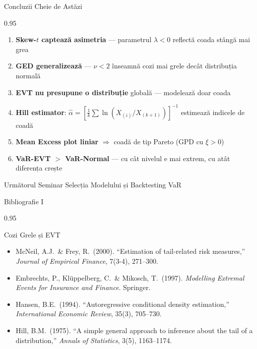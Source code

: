 \documentclass[9pt, aspectratio=169, t]{beamer}
\begin{document}
\begin{frame}{Concluzii Cheie de Astăzi}
    \begin{cminipage}{0.95\textwidth}
    \begin{enumerate}\setlength{\itemsep}{0pt}
        \item \textbf{Skew-$t$ captează asimetria} --- parametrul $\lambda < 0$ reflectă coada stângă mai grea
        \item \textbf{GED generalizează} --- $\nu < 2$ înseamnă cozi mai grele decât distribuția normală
        \item \textbf{EVT nu presupune o distribuție} globală --- modelează doar coada
        \item \textbf{Hill estimator}: $\hat{\alpha} = [\frac{1}{k}\sum \ln(X_{(i)}/X_{(k+1)})]^{-1}$ estimează indicele de coadă
        \item \textbf{Mean Excess plot liniar} $\Rightarrow$ coadă de tip Pareto (GPD cu $\xi > 0$)
        \item \textbf{VaR-EVT $>$ VaR-Normal} --- cu cât nivelul e mai extrem, cu atât diferența crește
    \end{enumerate}

    \vspace{0.3cm}
    \begin{block}{Următorul Seminar}
        Selecția Modelului și Backtesting VaR
    \end{block}
    \end{cminipage}
\end{frame}

\begin{frame}{Bibliografie I}
    \begin{cminipage}{0.95\textwidth}
    \begin{block}{Cozi Grele și EVT}
        {\small
        \begin{itemize}\setlength{\itemsep}{0pt}
            \item McNeil, A.J.\ \& Frey, R.\ (2000). ``Estimation of tail-related risk measures,'' \textit{Journal of Empirical Finance}, 7(3-4), 271--300.
            \item Embrechts, P., Klüppelberg, C.\ \& Mikosch, T.\ (1997). \textit{Modelling Extremal Events for Insurance and Finance}. Springer.
            \item Hansen, B.E.\ (1994). ``Autoregressive conditional density estimation,'' \textit{International Economic Review}, 35(3), 705--730.
            \item Hill, B.M.\ (1975). ``A simple general approach to inference about the tail of a distribution,'' \textit{Annals of Statistics}, 3(5), 1163--1174.
        \end{itemize}
        }
    \end{block}
    \end{cminipage}
\end{frame}
\end{document}
